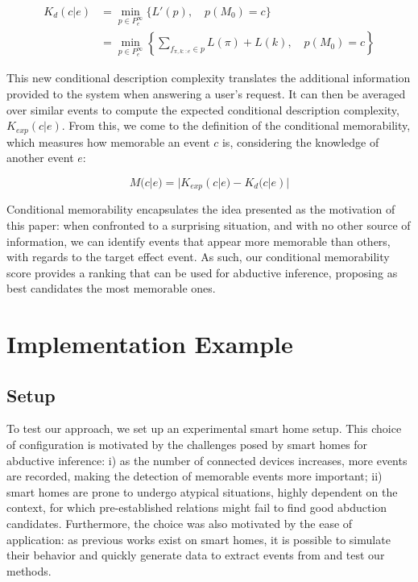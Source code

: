 \documentclass[conference]{IEEEtran}
\begin{document}
\begin{align}
  \label{eq:abd_k}
  K_d(c | e) & = \min_{p \in P^\infty_e} \{L'(p), \quad p(M_0)=c \}                                                \\
             & = \min_{p \in P^\infty_e} \left\{\sum_{f_{\pi, k::e} \in p} L(\pi) + L(k), \quad p(M_0) = c\right\}
\end{align}

This new conditional description complexity translates the additional information provided to the
system when answering a user's request. It can then be averaged over similar events to compute the expected conditional description complexity, $K_{exp}(c|e)$. From this, we come to the definition of the conditional memorability, which measures how memorable an event $c$ is, considering the knowledge of another event $e$:

\begin{equation}
  \label{eq:cond_mem}
  M(c|e) = |K_{exp}(c|e) - K_d(c|e)|
\end{equation}

Conditional memorability encapsulates the idea
presented as the motivation of this paper: when confronted to a surprising
situation, and with no other source of information, we can identify events that appear more memorable than others, with regards to the target effect event. As such, our conditional memorability score provides a ranking that can be used for abductive inference, proposing as best candidates the most memorable ones.

\section{Implementation Example}
\label{sec:example}
\subsection{Setup}
To test our approach, we set up an experimental smart home setup. This choice of
configuration is motivated by the challenges posed by smart homes for abductive
inference: i) as the number of connected devices increases, more events are
recorded, making the detection of memorable events more important; ii) smart
homes are prone to undergo atypical situations, highly dependent on the context,
for which pre-established relations might fail to find good abduction
candidates. Furthermore, the choice was also motivated by the ease of application: as
previous works exist on smart homes, it is possible to simulate their behavior
and quickly generate data to extract events from and test our methods.
\end{document}
